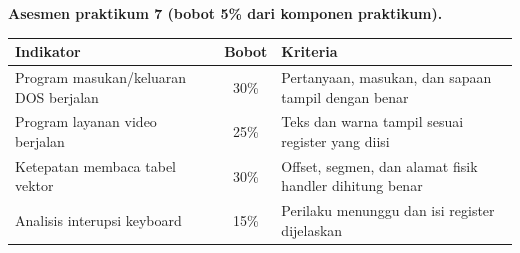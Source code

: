 \begin{asesmenbox}
\vspace{1.1em}
\textbf{Asesmen praktikum 7 (bobot 5\% dari komponen praktikum).}

\begin{tabular}{@{}p{6.2cm}cp{4.6cm}@{}}
    \toprule
    \textbf{Indikator} & \textbf{Bobot} & \textbf{Kriteria} \\
    \midrule
    Program masukan/keluaran DOS berjalan & 30\% &
    Pertanyaan, masukan, dan sapaan tampil dengan benar \\
    \addlinespace
    Program layanan video berjalan & 25\% &
    Teks dan warna tampil sesuai register yang diisi \\
    \addlinespace
    Ketepatan membaca tabel vektor & 30\% &
    Offset, segmen, dan alamat fisik handler dihitung benar \\
    \addlinespace
    Analisis interupsi keyboard & 15\% &
    Perilaku menunggu dan isi register dijelaskan \\
    \bottomrule
\end{tabular}
\end{asesmenbox}
